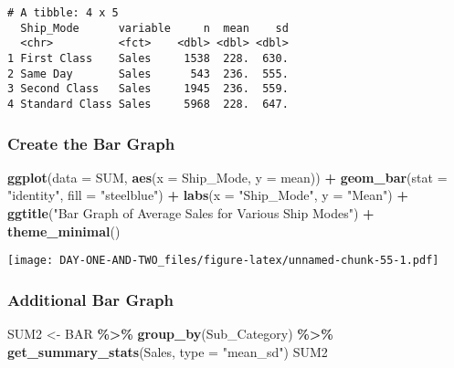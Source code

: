 \documentclass[
]{article}
\newenvironment{Shaded}{\begin{snugshade}}{\end{snugshade}}
\newcommand{\AttributeTok}[1]{\textcolor[rgb]{0.13,0.29,0.53}{#1}}
\newcommand{\FunctionTok}[1]{\textcolor[rgb]{0.13,0.29,0.53}{\textbf{#1}}}
\newcommand{\NormalTok}[1]{#1}
\newcommand{\OtherTok}[1]{\textcolor[rgb]{0.56,0.35,0.01}{#1}}
\newcommand{\SpecialCharTok}[1]{\textcolor[rgb]{0.81,0.36,0.00}{\textbf{#1}}}
\newcommand{\StringTok}[1]{\textcolor[rgb]{0.31,0.60,0.02}{#1}}
\begin{document}
\begin{verbatim}
# A tibble: 4 x 5
  Ship_Mode      variable     n  mean    sd
  <chr>          <fct>    <dbl> <dbl> <dbl>
1 First Class    Sales     1538  228.  630.
2 Same Day       Sales      543  236.  555.
3 Second Class   Sales     1945  236.  559.
4 Standard Class Sales     5968  228.  647.
\end{verbatim}

\hypertarget{create-the-bar-graph}{%
\subsubsection{Create the Bar Graph}\label{create-the-bar-graph}}

\begin{Shaded}
\begin{Highlighting}[]
\FunctionTok{ggplot}\NormalTok{(}\AttributeTok{data =}\NormalTok{ SUM, }\FunctionTok{aes}\NormalTok{(}\AttributeTok{x =}\NormalTok{ Ship\_Mode, }\AttributeTok{y =}\NormalTok{ mean)) }\SpecialCharTok{+}
  \FunctionTok{geom\_bar}\NormalTok{(}\AttributeTok{stat =} \StringTok{"identity"}\NormalTok{, }\AttributeTok{fill =} \StringTok{"steelblue"}\NormalTok{) }\SpecialCharTok{+}
  \FunctionTok{labs}\NormalTok{(}\AttributeTok{x =} \StringTok{"Ship\_Mode"}\NormalTok{, }\AttributeTok{y =} \StringTok{"Mean"}\NormalTok{) }\SpecialCharTok{+}
  \FunctionTok{ggtitle}\NormalTok{(}\StringTok{"Bar Graph of Average Sales for Various Ship Modes"}\NormalTok{) }\SpecialCharTok{+}
  \FunctionTok{theme\_minimal}\NormalTok{()}
\end{Highlighting}
\end{Shaded}

\texttt{[image: DAY-ONE-AND-TWO\_files/figure-latex/unnamed-chunk-55-1.pdf]}

\hypertarget{additional-bar-graph}{%
\subsubsection{Additional Bar Graph}\label{additional-bar-graph}}

\begin{Shaded}
\begin{Highlighting}[]
\NormalTok{SUM2 }\OtherTok{\textless{}{-}}\NormalTok{ BAR }\SpecialCharTok{\%\textgreater{}\%}
  \FunctionTok{group\_by}\NormalTok{(Sub\_Category) }\SpecialCharTok{\%\textgreater{}\%}
  \FunctionTok{get\_summary\_stats}\NormalTok{(Sales, }\AttributeTok{type =} \StringTok{"mean\_sd"}\NormalTok{)}
\NormalTok{SUM2}
\end{Highlighting}
\end{Shaded}
\end{document}
